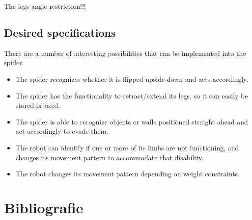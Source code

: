\documentclass[10pt,a4paper]{article}
\begin{document}
The legs angle restriction!!!

\subsection{Desired specifications}
There are a number of interesting possibilities that can be implemented into the spider.

\begin{itemize}
\item The spider recognizes whether it is flipped upside-down and acts accordingly.
\item The spider has the functionality to retract/extend its legs, so it can easily be stored or used.
\item The spider is able to recognize objects or walls positioned straight ahead and act accordingly to evade them.
\item The robot can identify if one or more of its limbs are not functioning, and changes its movement pattern to accommodate that disability.
\item The robot changes its movement pattern depending on weight constraints.
\end{itemize}


\section{Bibliografie}


\end{document}
